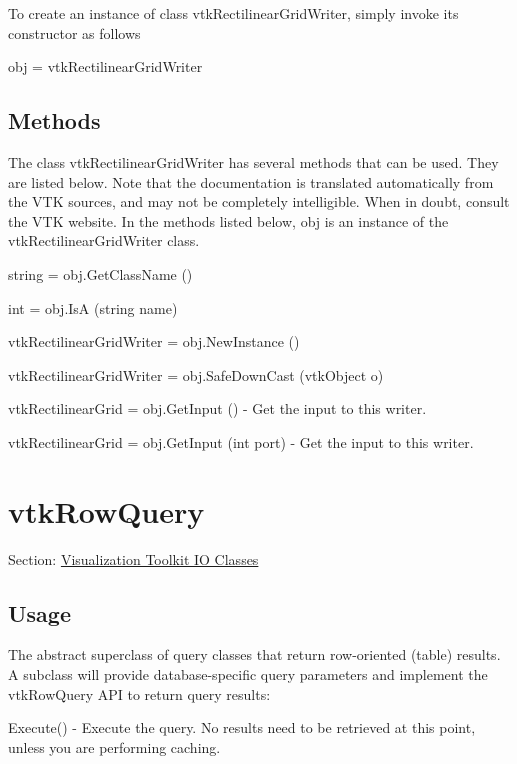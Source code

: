 To create an instance of class vtk\-Rectilinear\-Grid\-Writer, simply invoke its constructor as follows \begin{DoxyVerb}  obj = vtkRectilinearGridWriter
\end{DoxyVerb}
 \hypertarget{vtkwidgets_vtkxyplotwidget_Methods}{}\subsection{Methods}\label{vtkwidgets_vtkxyplotwidget_Methods}
The class vtk\-Rectilinear\-Grid\-Writer has several methods that can be used. They are listed below. Note that the documentation is translated automatically from the V\-T\-K sources, and may not be completely intelligible. When in doubt, consult the V\-T\-K website. In the methods listed below, {\ttfamily obj} is an instance of the vtk\-Rectilinear\-Grid\-Writer class. 
\begin{DoxyItemize}
\item {\ttfamily string = obj.\-Get\-Class\-Name ()}  
\item {\ttfamily int = obj.\-Is\-A (string name)}  
\item {\ttfamily vtk\-Rectilinear\-Grid\-Writer = obj.\-New\-Instance ()}  
\item {\ttfamily vtk\-Rectilinear\-Grid\-Writer = obj.\-Safe\-Down\-Cast (vtk\-Object o)}  
\item {\ttfamily vtk\-Rectilinear\-Grid = obj.\-Get\-Input ()} -\/ Get the input to this writer.  
\item {\ttfamily vtk\-Rectilinear\-Grid = obj.\-Get\-Input (int port)} -\/ Get the input to this writer.  
\end{DoxyItemize}\hypertarget{vtkio_vtkrowquery}{}\section{vtk\-Row\-Query}\label{vtkio_vtkrowquery}
Section\-: \hyperlink{sec_vtkio}{Visualization Toolkit I\-O Classes} \hypertarget{vtkwidgets_vtkxyplotwidget_Usage}{}\subsection{Usage}\label{vtkwidgets_vtkxyplotwidget_Usage}
The abstract superclass of query classes that return row-\/oriented (table) results. A subclass will provide database-\/specific query parameters and implement the vtk\-Row\-Query A\-P\-I to return query results\-:

Execute() -\/ Execute the query. No results need to be retrieved at this point, unless you are performing caching.

